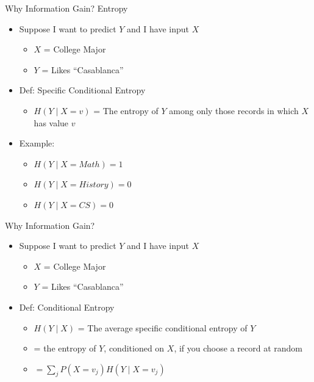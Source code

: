 \begin{frame}[allowframebreaks]{Why Information Gain? Entropy}

\begin{itemize}
  \item Suppose I want to predict $Y$ and I have input $X$
  \begin{itemize}
    \item $X$ = College Major
    \item $Y$ = Likes ``Casablanca''
  \end{itemize}
\end{itemize}


\begin{itemize}
  \item Def: Specific Conditional Entropy
  \begin{itemize}
    \item $H(Y \mid X = v)$ = The entropy of $Y$ among only those records in which $X$ has value $v$
  \end{itemize}
  \item Example:
  \begin{itemize}
    \item $H(Y \mid X = Math) = 1$
    \item $H(Y \mid X = History) = 0$
    \item $H(Y \mid X = CS) = 0$
  \end{itemize}
\end{itemize}

\end{frame}


\begin{frame}[allowframebreaks]{Why Information Gain?}

\begin{itemize}
  \item Suppose I want to predict $Y$ and I have input $X$
  \begin{itemize}
    \item $X$ = College Major
    \item $Y$ = Likes ``Casablanca''
  \end{itemize}
\end{itemize}


\begin{itemize}
  \item Def: Conditional Entropy
  \begin{itemize}
    \item $H(Y \mid X)$ = The average specific conditional entropy of $Y$
    \item = the entropy of $Y$, conditioned on $X$, if you choose a record at random
    \item $= \sum_j P(X = v_j) H(Y \mid X = v_j)$
  \end{itemize}
\end{itemize}

\end{frame}



